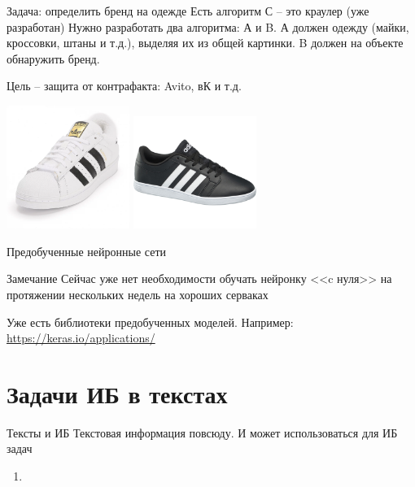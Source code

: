 \begin{frame}{Задача: определить бренд на одежде}
	\small
	Есть алгоритм С -- это краулер (уже разработан)
	Нужно разработать два алгоритма: А и B.
	А должен одежду (майки, кроссовки, штаны и т.д.),
	выделяя их из общей картинки. B должен на объекте обнаружить бренд.
	
	Цель -- защита от контрафакта: Avito, вК и т.д.
	
	\includegraphics[width=4cm]{../pic/adidas1.png}
	\includegraphics[width=4cm]{../pic/adidas2.png}
	
	
\end{frame}

\begin{frame}{Предобученные нейронные сети}
	
	\begin{block}{Замечание}
	Сейчас уже нет необходимости обучать нейронку <<c нуля>>
	на протяжении нескольких недель на хороших серваках
	
	Уже есть библиотеки предобученных моделей. 
	Например: \url{https://keras.io/applications/}
	\end{block}
\end{frame}

\section{Задачи ИБ в текстах}\label{section:text_tasks}

\begin{frame}{Тексты и ИБ}
	Текстовая информация повсюду. 
	И может использоваться для ИБ задач
	\begin{enumerate}
		\item {}
	\end{enumerate}
\end{frame}


